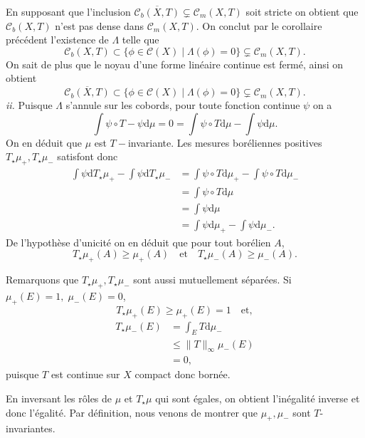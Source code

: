 \documentclass[12pt]{article}
\newcommand{\de}{\mathrm{d}}
\begin{document}
En supposant que l'inclusion $\overline{\mathcal{C}_{b}(X,T)} \subsetneq \mathcal{C}_{m}(X,T)$ soit stricte on obtient que $\mathcal{C}_{b}(X,T)$ n'est pas dense dans $\mathcal{C}_{m}(X,T)$. On conclut par le corollaire précédent l'existence de $\Lambda$ telle que  \[
        \mathcal{C}_{b}(X,T) \subset \{\phi \in \mathcal{C}(X) \;|\; \Lambda(\phi) = 0\} \subsetneq \mathcal{C}_{m}(X,T) 
.\] 
On sait de plus que le noyau d'une forme linéaire continue est fermé, ainsi on obtient \[
        \overline{\mathcal{C}_{b}(X,T)} \subset \{\phi \in \mathcal{C}(X) \;|\; \Lambda(\phi) = 0\} \subsetneq \mathcal{C}_{m}(X,T) 
.\]  
\textit{ii.} Puisque $\Lambda$ s'annule sur les cobords, pour toute fonction continue $\psi$ on a  \[
\int\psi\circ T -\psi\de\mu = 0 = \int\psi\circ T\de\mu - \int\psi\de\mu
.\] On en déduit que $\mu$ est $T-$invariante. Les mesures boréliennes positives $T_{\star}\mu_{+}, T_{\star}\mu_{-}$ satisfont donc
\begin{align*}
        \int\psi\de T_{\star}\mu_{+} - \int\psi\de T_{\star}\mu_{-} &= \int\psi \circ T\de\mu_{+} - \int\psi \circ T\de\mu_{-} \\ 
                                                                    &= \int\psi\circ T\de\mu \\
                                                                    &= \int\psi\de\mu \\
                                                                    &= \int\psi\de\mu_{+} - \int\psi\de\mu_{-} 
.\end{align*}
De l'hypothèse d'unicité on en déduit que pour tout borélien $A$, \[
        T_{\star}\mu_{+}(A) \ge \mu_{+}(A) \quad \text{et} \quad T_{\star}\mu_{-}(A) \ge \mu_{-}(A)
.\] 

Remarquons que $T_{\star}\mu_{+}, T_{\star}\mu_{-}$ sont aussi mutuellement séparées. Si $\mu_{+}(E) = 1, \; \mu_{-}(E) = 0$,
\[
        T_{\star}\mu_{+}(E) \ge \mu_{+}(E) = 1 \quad \text{et}
,\] 
\begin{align*}
        T_{\star}\mu_{-}(E) &= \int_{E}T\de\mu_{-} \\
                            &\le \|T\|_{\infty}\mu_{-}(E) \\
                            &= 0
,\end{align*} puisque $T$ est continue sur $X$ compact donc bornée.

En inversant les rôles de $\mu$ et $T_{\star}\mu$ qui sont égales, on obtient l'inégalité inverse et donc l'égalité. Par définition, nous venons de montrer que $\mu_{+}, \mu_{-}$ sont $T$-invariantes.
\end{document}
